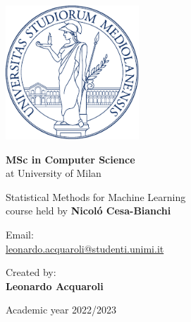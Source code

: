 \documentclass[a4paper]{report}
\begin{document}


\begin{titlepage}
    \begin{center}
        \includegraphics[height=5cm]{minerva.pdf} %

        \vspace*{1.75cm}

        \LARGE


        \textbf{MSc in Computer Science} \\
        at University of Milan

        \vspace*{1cm}

        
        \huge
        Statistical Methods for Machine Learning\\
        
        \large course held by \textbf{Nicoló Cesa-Bianchi}
        

        \normalsize
        \vspace*{4cm}

        \begin{minipage}[t]{0.47\textwidth}
	       {Email: } \vspace{0.3em} \\
              {\large \href{leonardo.acquaroli@studenti.unimi.it}{leonardo.acquaroli@studenti.unimi.it}}   \\
        \end{minipage}
        \hfill
        \begin{minipage}[t]{0.47\textwidth}\raggedleft
	       {Created by:} \hspace{-0.9em} \vspace{0.3em} \\
              {\large \textbf{Leonardo Acquaroli}} \\
        \end{minipage}

        \vfill
        Academic year 2022/2023
            
    \end{center}
\end{titlepage}
\end{document}
